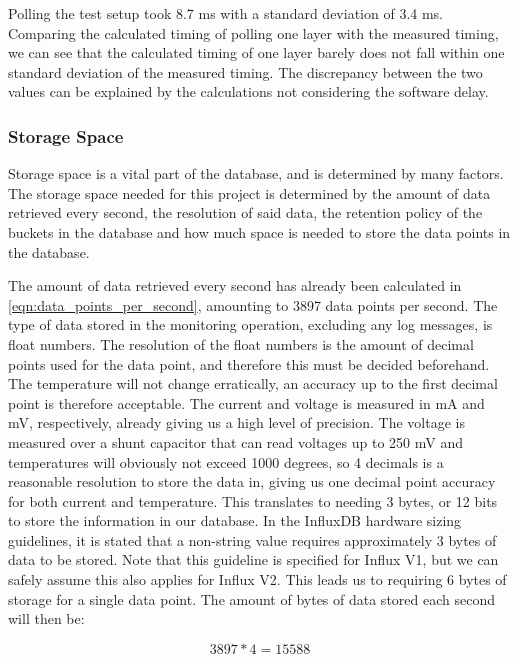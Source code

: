 \documentclass[main.tex]{subfiles}
\begin{document}
Polling the test setup took 8.7 ms with a standard deviation of 3.4 ms. Comparing the calculated timing of polling one layer with the measured timing, we can see that the calculated timing of one layer barely does not fall within one standard deviation of the measured timing. The discrepancy between the two values can be explained by the calculations not considering the software delay.

\subsubsection{Storage Space}
Storage space is a vital part of the database, and is determined by many factors. The storage space needed for this project is determined by the amount of data retrieved every second, the resolution of said data, the retention policy of the buckets in the database and how much space is needed to store the data points in the database.

The amount of data retrieved every second has already been calculated in \autoref{eqn:data_points_per_second}, amounting to 3897 data points per second. The type of data stored in the monitoring operation, excluding any log messages, is float numbers. The resolution of the float numbers is the amount of decimal points used for the data point, and therefore this must be decided beforehand. The temperature will not change erratically, an accuracy up to the first decimal point is therefore acceptable. The current and voltage is measured in mA and mV, respectively, already giving us a high level of precision. The voltage is measured over a shunt capacitor that can read voltages up to 250 mV and temperatures will obviously not exceed 1000 degrees, so 4 decimals is a reasonable resolution to store the data in, giving us one decimal point accuracy for both current and temperature. This translates to needing 3 bytes, or 12 bits to store the information in our database. In the InfluxDB hardware sizing guidelines, it is stated that a non-string value requires approximately 3 bytes of data to be stored\cite{influx_sizing}. Note that this guideline is specified for Influx V1, but we can safely assume this also applies for Influx V2. This leads us to requiring 6 bytes of storage for a single data point. The amount of bytes of data stored each second will then be: 

\begin{equation} \label{eqn:total_bytes_per_second}
3897*4 = 15588 
\end{equation}
\end{document}
